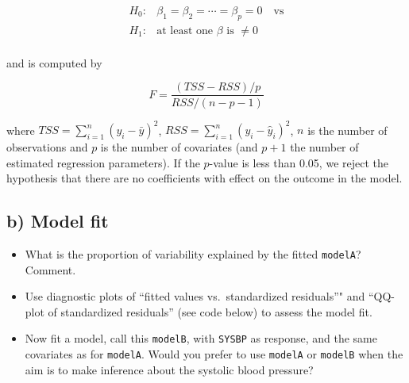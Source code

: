 \documentclass[]{article}
\providecommand{\tightlist}{%
  \setlength{\itemsep}{0pt}\setlength{\parskip}{0pt}}
\begin{document}
\begin{itemize}
  \begin{align*}
    H_0: & \beta_1 = \beta_2 = \cdots = \beta_p = 0 \quad \text{vs} \\
    H_1: &\text{at least one $\beta$ is $\neq 0$} \\ 
  \end{align*}

  and is computed by

  \begin{equation*}
    F = \frac{(TSS-RSS)/p}{RSS/(n-p-1)}
  \end{equation*}

  where \(TSS= \sum_{i=1}^n(y_i-\bar y)^2\),
  \(RSS = \sum_{i=1}^n(y_i-\hat y_i)^2\), \(n\) is the number of
  observations and \(p\) is the number of covariates (and \(p+1\) the
  number of estimated regression parameters). If the \(p\)-value is less
  than 0.05, we reject the hypothesis that there are no coefficients
  with effect on the outcome in the model.\\
\end{itemize}

\subsection{b) Model fit}\label{b-model-fit}

\begin{itemize}
\tightlist
\item
  What is the proportion of variability explained by the fitted
  \texttt{modelA}? Comment.
\item
  Use diagnostic plots of ``fitted values vs.~standardized residuals''"
  and ``QQ-plot of standardized residuals'' (see code below) to assess
  the model fit.
\item
  Now fit a model, call this \texttt{modelB}, with \texttt{SYSBP} as
  response, and the same covariates as for \texttt{modelA}. Would you
  prefer to use \texttt{modelA} or \texttt{modelB} when the aim is to
  make inference about the systolic blood pressure?
\end{itemize}
\end{document}
